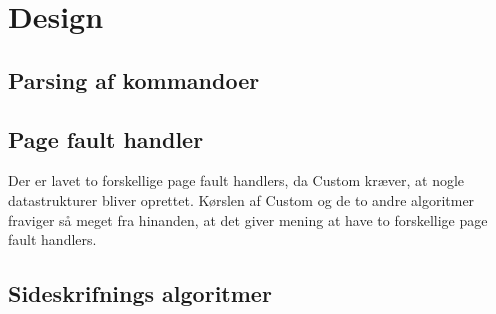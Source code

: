 \section{Design}

\subsection{Parsing af kommandoer}

\subsection{Page fault handler}
Der er lavet to forskellige page fault handlers, da Custom kræver, at nogle datastrukturer bliver oprettet. Kørslen af Custom og de to andre algoritmer fraviger så meget fra hinanden, at det giver mening at have to forskellige page fault handlers.

\subsection{Sideskrifnings algoritmer}